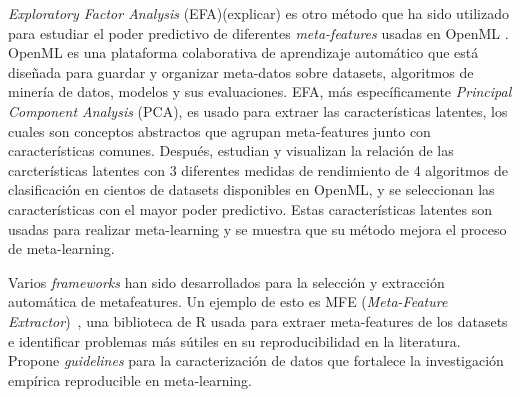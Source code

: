 \textit{Exploratory Factor Analysis} (EFA)(explicar) es otro método que ha sido utilizado para estudiar el poder predictivo de diferentes \textit{meta-features} usadas en OpenML \cite{bilalli2017predictive}. OpenML es una plataforma colaborativa de aprendizaje automático que está diseñada para guardar y organizar meta-datos sobre datasets, algoritmos de minería de datos, modelos y sus evaluaciones. EFA, más específicamente \textit{Principal Component Analysis} (PCA),  es usado para extraer las características latentes, los cuales son conceptos abstractos que agrupan meta-features junto con características comunes. Después, estudian y visualizan la relación de las carcterísticas latentes con 3 diferentes medidas de rendimiento de 4 algoritmos de clasificación en cientos de datasets disponibles en OpenML, y se seleccionan las características con el mayor poder predictivo. Estas características latentes son usadas para realizar meta-learning y se muestra que su método mejora el proceso de meta-learning.


Varios \textit{frameworks} han sido desarrollados para la selección y extracción automática de metafeatures. Un ejemplo de esto es MFE (\textit{Meta-Feature Extractor})~\cite{Rivolli2018TowardsRE}, una biblioteca de R usada para extraer meta-features de los datasets e identificar problemas más sútiles en su reproducibilidad en la literatura. Propone \textit{guidelines} para la caracterización de datos que fortalece la investigación empírica reproducible en meta-learning. 


%

